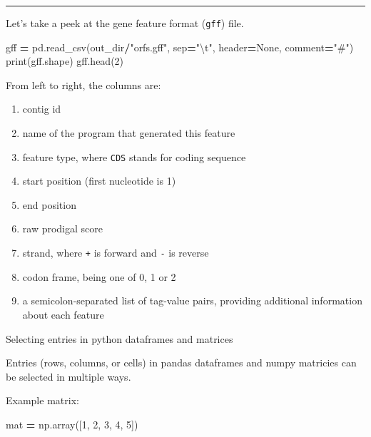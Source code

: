 \documentclass[
]{book}
\newenvironment{Shaded}{\begin{snugshade}}{\end{snugshade}}
\newcommand{\BuiltInTok}[1]{#1}
\newcommand{\CharTok}[1]{\textcolor[rgb]{0.31,0.60,0.02}{#1}}
\newcommand{\DecValTok}[1]{\textcolor[rgb]{0.00,0.00,0.81}{#1}}
\newcommand{\NormalTok}[1]{#1}
\newcommand{\OperatorTok}[1]{\textcolor[rgb]{0.81,0.36,0.00}{\textbf{#1}}}
\newcommand{\StringTok}[1]{\textcolor[rgb]{0.31,0.60,0.02}{#1}}
\newcommand{\VariableTok}[1]{\textcolor[rgb]{0.00,0.00,0.00}{#1}}
\providecommand{\tightlist}{%
  \setlength{\itemsep}{0pt}\setlength{\parskip}{0pt}}
\begin{document}
\begin{center}\rule{0.5\linewidth}{0.5pt}\end{center}

Let's take a peek at the gene feature format (\texttt{gff}) file.

\begin{Shaded}
\begin{Highlighting}[numbers=left,,]
\NormalTok{gff }\OperatorTok{=}\NormalTok{ pd.read\_csv(out\_dir}\OperatorTok{/}\StringTok{"orfs.gff"}\NormalTok{, sep}\OperatorTok{=}\StringTok{"}\CharTok{\textbackslash{}t}\StringTok{"}\NormalTok{, header}\OperatorTok{=}\VariableTok{None}\NormalTok{, comment}\OperatorTok{=}\StringTok{"\#"}\NormalTok{)}
\BuiltInTok{print}\NormalTok{(gff.shape)}
\NormalTok{gff.head(}\DecValTok{2}\NormalTok{)}
\end{Highlighting}
\end{Shaded}

From left to right, the columns are:

\begin{enumerate}
\def\labelenumi{\arabic{enumi}.}
\setcounter{enumi}{-1}
\tightlist
\item
  contig id
\item
  name of the program that generated this feature
\item
  feature type, where \texttt{CDS} stands for coding sequence
\item
  start position (first nucleotide is 1)
\item
  end position
\item
  raw prodigal score
\item
  strand, where \texttt{+} is forward and \texttt{-} is reverse
\item
  codon frame, being one of 0, 1 or 2
\item
  a semicolon-separated list of tag-value pairs, providing additional information about each feature
\end{enumerate}

Selecting entries in python dataframes and matrices

Entries (rows, columns, or cells) in pandas dataframes and numpy matricies can be selected in multiple ways.

Example matrix:

\begin{Shaded}
\begin{Highlighting}[numbers=left,,]
\NormalTok{mat }\OperatorTok{=}\NormalTok{ np.array([}\DecValTok{1}\NormalTok{, }\DecValTok{2}\NormalTok{, }\DecValTok{3}\NormalTok{, }\DecValTok{4}\NormalTok{, }\DecValTok{5}\NormalTok{])}
\end{Highlighting}
\end{Shaded}
\end{document}
